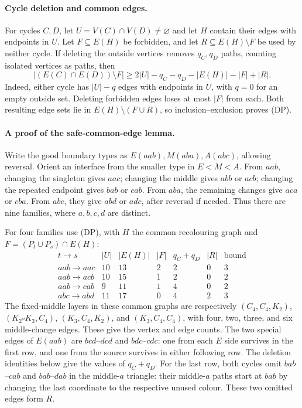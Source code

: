 \paragraph{Cycle deletion and common edges.}
For cycles $C,D$, let $U=V(C)\cap V(D)\ne\varnothing$ and let $H$
contain their edges with endpoints in $U$. Let $F\subseteq E(H)$ be
forbidden, and let $R\subseteq E(H)\setminus F$ be used by neither
cycle. If deleting the outside vertices removes $q_C,q_D$ paths,
counting isolated vertices as paths, then
\[
 |(E(C)\cap E(D))\setminus F|
 \ge 2|U|-q_C-q_D-|E(H)|-|F|+|R|.                 \tag{DP}
\]
Indeed, either cycle has $|U|-q$ edges with endpoints in $U$, with
$q=0$ for an empty outside set. Deleting forbidden edges loses at
most $|F|$ from each. Both resulting edge sets lie in
$E(H)\setminus(F\cup R)$, so inclusion--exclusion proves (DP).

\paragraph{A proof of the safe-common-edge lemma.}
Write the good boundary types as $E(aab),M(aba),A(abc)$, allowing
reversal. Orient an interface from the smaller type in $E<M<A$.
From $aab$, changing the singleton gives $aac$; changing the middle
gives $abb$ or $acb$; changing the repeated endpoint gives $bab$ or
$cab$. From $aba$, the remaining changes give $aca$ or $cba$.
From $abc$, they give $abd$ or $adc$, after reversal if needed.
Thus there are nine families, where $a,b,c,d$ are distinct.

For four families use (DP), with $H$ the common recolouring graph and
$F=(P_t\cup P_s)\cap E(H)$:
\[
\begin{array}{c|rrrrr|r}
 t\to s&|U|&|E(H)|&|F|&q_C+q_D&|R|&\text{bound}\\\hline
 aab\to aac&10&13&2&2&0&3\\
 aab\to acb&10&15&1&2&0&2\\
 aab\to cab&9&11&1&4&0&2\\
 abc\to abd&11&17&0&4&2&3
\end{array}                                                     \tag{CT}
\]
The fixed-middle layers in these common graphs are respectively
$(C_4,C_4,K_2)$, $(K_2\square K_3,C_4)$, $(K_3,C_4,K_2)$, and
$(K_3,C_4,C_4)$, with four, two, three, and six middle-change edges.
These give the vertex and edge counts. The two special edges of $E(aab)$
are $bcd$--$dcd$ and $bdc$--$cdc$: one from each $E$ side survives in
the first row, and one from the source survives in either following row.
The deletion identities below give the values of
$q_C+q_D$. For the last row, both cycles omit $bab$--$cab$ and
$bab$--$dab$ in the middle-$a$ triangle: their middle-$a$ paths start
at $bab$ by changing the last coordinate to the respective unused
colour. These two omitted edges form $R$.

